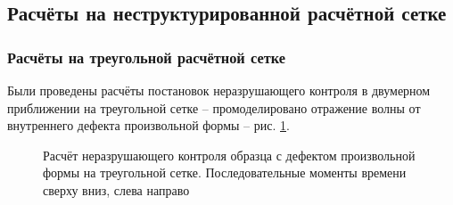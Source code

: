 \subsection{Расчёты на неструктурированной расчётной сетке}
\subsubsection{Расчёты на треугольной расчётной сетке}
Были проведены расчёты постановок неразрушающего контроля в двумерном приближении на треугольной сетке -- промоделировано отражение волны от внутреннего дефекта произвольной формы -- рис. \ref{pic:2d}.
\begin{figure}%
	\caption{Расчёт неразрушающего контроля образца с дефектом произвольной формы на треугольной сетке. Последовательные моменты времени сверху вниз, слева направо}
	\label{pic:2d}
\end{figure}

